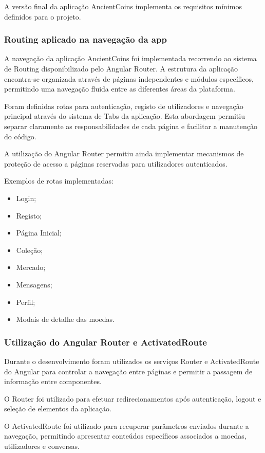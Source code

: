 \documentclass[12pt,a4paper]{article}
\begin{document}
A versão final da aplicação AncientCoins implementa os requisitos mínimos definidos para o projeto.

\subsubsection{Routing aplicado na navegação da app}

A navegação da aplicação AncientCoins foi implementada recorrendo ao sistema de Routing disponibilizado pelo Angular Router. A estrutura da aplicação encontra-se organizada através de páginas independentes e módulos específicos, permitindo uma navegação fluida entre as diferentes áreas da plataforma.

Foram definidas rotas para autenticação, registo de utilizadores e navegação principal através do sistema de Tabs da aplicação. Esta abordagem permitiu separar claramente as responsabilidades de cada página e facilitar a manutenção do código.

A utilização do Angular Router permitiu ainda implementar mecanismos de proteção de acesso a páginas reservadas para utilizadores autenticados.

Exemplos de rotas implementadas:

\begin{itemize}
\setlength{\itemsep}{0.15em}
\item Login;
\item Registo;
\item Página Inicial;
\item Coleção;
\item Mercado;
\item Mensagens;
\item Perfil;
\item Modais de detalhe das moedas.
\end{itemize}

\subsubsection{Utilização do Angular Router e ActivatedRoute}

Durante o desenvolvimento foram utilizados os serviços Router e ActivatedRoute do Angular para controlar a navegação entre páginas e permitir a passagem de informação entre componentes.

O Router foi utilizado para efetuar redirecionamentos após autenticação, logout e seleção de elementos da aplicação.

O ActivatedRoute foi utilizado para recuperar parâmetros enviados durante a navegação, permitindo apresentar conteúdos específicos associados a moedas, utilizadores e conversas.
\end{document}
